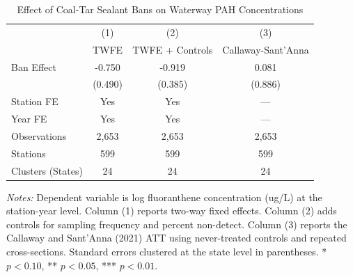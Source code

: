 \begin{table}[htbp]
\centering
\caption{Effect of Coal-Tar Sealant Bans on Waterway PAH Concentrations}
\label{tab:main}
\begin{tabular}{lccc}
\toprule
 & (1) & (2) & (3) \\
 & TWFE & TWFE + Controls & Callaway-Sant'Anna \\
\midrule
Ban Effect & -0.750 & -0.919 & 0.081 \\
 & (0.490) & (0.385) & (0.886) \\
\midrule
Station FE & Yes & Yes & --- \\
Year FE & Yes & Yes & --- \\
Observations & 2,653 & 2,653 & 2,653 \\
Stations & 599 & 599 & 599 \\
Clusters (States) & 24 & 24 & 24 \\
\bottomrule
\end{tabular}
\begin{tablenotes}
\item \textit{Notes:} Dependent variable is log fluoranthene concentration (ug/L) at the station-year level. 
Column (1) reports two-way fixed effects. Column (2) adds controls for sampling frequency and percent non-detect. 
Column (3) reports the Callaway and Sant'Anna (2021) ATT using never-treated controls and repeated cross-sections. 
Standard errors clustered at the state level in parentheses. 
* $p<0.10$, ** $p<0.05$, *** $p<0.01$.
\end{tablenotes}
\end{table}
